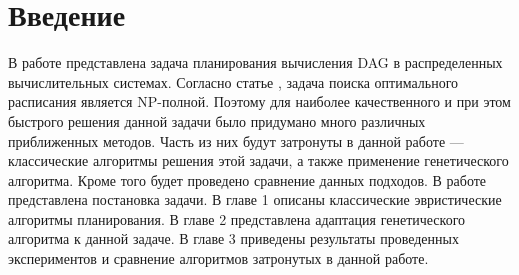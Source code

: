 \chapter*{Введение}




\begin{spacing}{1.3}
В работе представлена задача планирования вычисления DAG в распределенных вычислительных системах. Согласно статье \cite{NPCOMP}, задача поиска оптимального расписания является NP-полной. Поэтому для наиболее качественного и при этом быстрого решения данной задачи было придумано много различных приближенных методов. Часть из них будут затронуты в данной работе --- классические алгоритмы решения этой задачи, а также применение генетического алгоритма. Кроме того будет проведено сравнение данных подходов. В работе представлена постановка задачи. В главе 1 описаны классические эвристические алгоритмы планирования. В главе 2 представлена адаптация генетического алгоритма к данной задаче. В главе 3 приведены результаты проведенных экспериментов и сравнение алгоритмов затронутых в данной работе.
 
\end{spacing}

